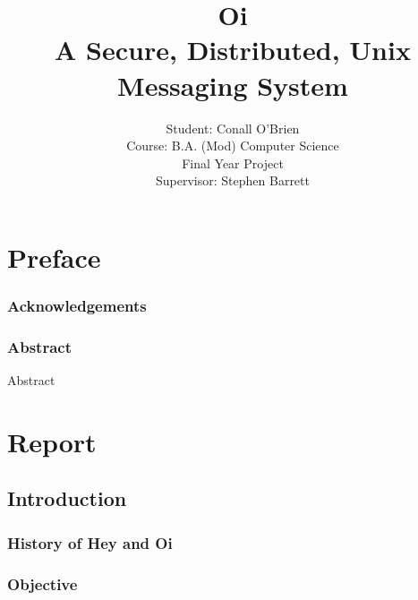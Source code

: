 \documentclass[a4paper,12pt]{report}
\begin{document}
\setlength{\rightskip}{0pt plus 2cm}

\title{Oi \\ A Secure, Distributed, Unix Messaging System}

\author{Student: Conall O'Brien \\ 
		  Course:  B.A. (Mod) Computer Science \\
		  Final Year Project \\ 
		  Supervisor: Stephen Barrett} 

\maketitle


\part*{Preface}

\section{Acknowledgements}



\pagebreak

\section{Abstract}

Abstract

\tableofcontents

\listoffigures

\part*{Report}

\chapter{Introduction}

\setcounter{page}{12}

\section{History of Hey and Oi}



\section{Objective}
\end{document}
